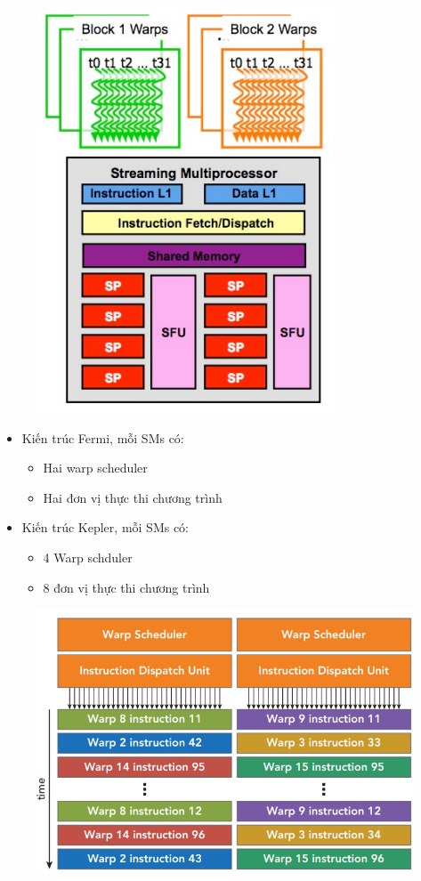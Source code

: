 \documentclass[14pt, a4paper]{article}
\numberwithin{equation}{section}
\numberwithin{figure}{section}
\numberwithin{dl}{section}
\numberwithin{md}{section}
\numberwithin{bd}{section}
\numberwithin{dn}{section}
\numberwithin{hq}{section}
\begin{document}
\begin{figure}[H]
    \centering
    \includegraphics[width=0.5\linewidth]{figures/CUDA/SIMT_Warps.png}
\end{figure}

\begin{itemize}
    \item Kiến trúc Fermi, mỗi SMs có:
    \begin{itemize}
        \item Hai warp scheduler
        \item Hai đơn vị thực thi chương trình
    \end{itemize}
    \item Kiến trúc Kepler, mỗi SMs có:
    \begin{itemize}
        \item 4 Warp schduler
        \item 8 đơn vị thực thi chương trình
    \end{itemize}
\end{itemize}

\begin{figure}[H]
    \centering
    \includegraphics[width=0.6\linewidth]{figures/CUDA/Warp_Scheduler.png}
\end{figure}
\end{document}
